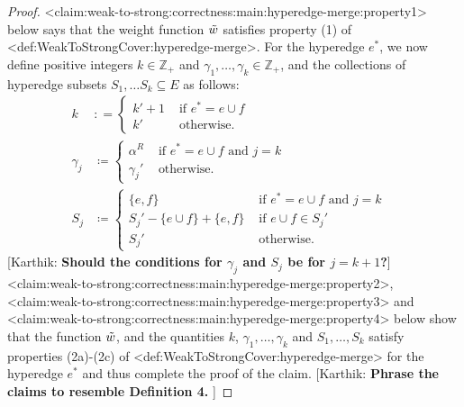 \documentclass{article}
\def\Cref#1{<#1>}%
\newcommand{\knote}[1]{{\color{red}[{\tiny Karthik: \bf #1}]\marginpar{\color{red}*}}}
\providecommand{\Z}{\mathbb{Z}}
\begin{document}
\begin{proof}
    \Cref{claim:weak-to-strong:correctness:main:hyperedge-merge:property1} below says that the weight function $\Tilde{w}$ satisfies property (1) of \Cref{def:WeakToStrongCover:hyperedge-merge}. For the hyperedge $e^*$, we now define positive integers $k \in \Z_+$ and $\gamma_1, \ldots, \gamma_{k} \in \Z_+$, and the collections of hyperedge subsets $S_1, \ldots S_{k} \subseteq E$ as follows:
    \begin{align*}
        k &: =\begin{cases}
            k' + 1& \text{ if } e^* = e\cup f\\
            k'&\text{ otherwise.}
        \end{cases}&\\
        \gamma_j&\coloneqq  \begin{cases}
            \alpha^R& \text{ if } e^* = e\cup f \text{ and } j = k\\
            \gamma_j'&\text{ otherwise}.
        \end{cases}&\\
        S_j& \coloneqq  \begin{cases}
            \{e, f\}&\text{ if } e^* = e\cup f \text{ and } j = k\\
            S_j' - \{e\cup f\} + \{e, f\}&\text{ if } e\cup f \in S_j'\\
            S_j'& \text{ otherwise.}
        \end{cases}&
    \end{align*}
    \knote{Should the conditions for $\gamma_j$ and $S_j$ be for $j=k+1$?} 
    \Cref{claim:weak-to-strong:correctness:main:hyperedge-merge:property2}, \Cref{claim:weak-to-strong:correctness:main:hyperedge-merge:property3} and \Cref{claim:weak-to-strong:correctness:main:hyperedge-merge:property4} below show that the function $\Tilde{w}$, and the quantities $k$, $\gamma_1, \ldots, \gamma_k$ and $S_1, \ldots, S_k$ satisfy properties (2a)-(2c) of \Cref{def:WeakToStrongCover:hyperedge-merge} for the hyperedge $e^*$ and thus complete the proof of the claim. \knote{Phrase the claims to resemble Definition 4. }
\end{proof}
\end{document}
